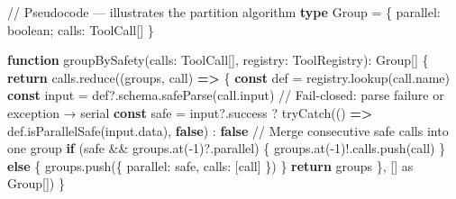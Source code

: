 \documentclass[
  english,
  11pt,
  letterpaper,
]{book}
\newenvironment{Shaded}{\begin{snugshade}}{\end{snugshade}}
\newcommand{\AttributeTok}[1]{\textcolor[rgb]{0.40,0.45,0.13}{#1}}
\newcommand{\CommentTok}[1]{\textcolor[rgb]{0.37,0.37,0.37}{#1}}
\newcommand{\ControlFlowTok}[1]{\textcolor[rgb]{0.00,0.23,0.31}{\textbf{#1}}}
\newcommand{\DataTypeTok}[1]{\textcolor[rgb]{0.68,0.00,0.00}{#1}}
\newcommand{\DecValTok}[1]{\textcolor[rgb]{0.68,0.00,0.00}{#1}}
\newcommand{\FunctionTok}[1]{\textcolor[rgb]{0.28,0.35,0.67}{#1}}
\newcommand{\ImportTok}[1]{\textcolor[rgb]{0.00,0.46,0.62}{#1}}
\newcommand{\KeywordTok}[1]{\textcolor[rgb]{0.00,0.23,0.31}{\textbf{#1}}}
\newcommand{\NormalTok}[1]{\textcolor[rgb]{0.00,0.23,0.31}{#1}}
\newcommand{\OperatorTok}[1]{\textcolor[rgb]{0.37,0.37,0.37}{#1}}
\begin{document}
\begin{Shaded}
\begin{Highlighting}[]
\CommentTok{// Pseudocode — illustrates the partition algorithm}
\KeywordTok{type}\NormalTok{ Group }\OperatorTok{=}\NormalTok{ \{ parallel}\OperatorTok{:} \DataTypeTok{boolean}\OperatorTok{;}\NormalTok{ calls}\OperatorTok{:}\NormalTok{ ToolCall[] \}}

\KeywordTok{function} \FunctionTok{groupBySafety}\NormalTok{(calls}\OperatorTok{:}\NormalTok{ ToolCall[]}\OperatorTok{,}\NormalTok{ registry}\OperatorTok{:}\NormalTok{ ToolRegistry)}\OperatorTok{:}\NormalTok{ Group[] \{}
  \ControlFlowTok{return}\NormalTok{ calls}\OperatorTok{.}\FunctionTok{reduce}\NormalTok{((groups}\OperatorTok{,}\NormalTok{ call) }\KeywordTok{=\textgreater{}}\NormalTok{ \{}
    \KeywordTok{const}\NormalTok{ def }\OperatorTok{=}\NormalTok{ registry}\OperatorTok{.}\FunctionTok{lookup}\NormalTok{(call}\OperatorTok{.}\AttributeTok{name}\NormalTok{)}
    \KeywordTok{const}\NormalTok{ input }\OperatorTok{=}\NormalTok{ def}\OperatorTok{?.}\AttributeTok{schema}\OperatorTok{.}\FunctionTok{safeParse}\NormalTok{(call}\OperatorTok{.}\AttributeTok{input}\NormalTok{)}
    \CommentTok{// Fail{-}closed: parse failure or exception → serial}
    \KeywordTok{const}\NormalTok{ safe }\OperatorTok{=}\NormalTok{ input}\OperatorTok{?.}\AttributeTok{success}
      \OperatorTok{?} \FunctionTok{tryCatch}\NormalTok{(() }\KeywordTok{=\textgreater{}}\NormalTok{ def}\OperatorTok{.}\FunctionTok{isParallelSafe}\NormalTok{(input}\OperatorTok{.}\AttributeTok{data}\NormalTok{)}\OperatorTok{,} \KeywordTok{false}\NormalTok{)}
      \OperatorTok{:} \KeywordTok{false}
    \CommentTok{// Merge consecutive safe calls into one group}
    \ControlFlowTok{if}\NormalTok{ (safe }\OperatorTok{\&\&}\NormalTok{ groups}\OperatorTok{.}\FunctionTok{at}\NormalTok{(}\OperatorTok{{-}}\DecValTok{1}\NormalTok{)}\OperatorTok{?.}\AttributeTok{parallel}\NormalTok{) \{}
\NormalTok{      groups}\OperatorTok{.}\FunctionTok{at}\NormalTok{(}\OperatorTok{{-}}\DecValTok{1}\NormalTok{)}\OperatorTok{!.}\AttributeTok{calls}\OperatorTok{.}\FunctionTok{push}\NormalTok{(call)}
\NormalTok{    \} }\ControlFlowTok{else}\NormalTok{ \{}
\NormalTok{      groups}\OperatorTok{.}\FunctionTok{push}\NormalTok{(\{ parallel}\OperatorTok{:}\NormalTok{ safe}\OperatorTok{,}\NormalTok{ calls}\OperatorTok{:}\NormalTok{ [call] \})}
\NormalTok{    \}}
    \ControlFlowTok{return}\NormalTok{ groups}
\NormalTok{  \}}\OperatorTok{,}\NormalTok{ [] }\ImportTok{as}\NormalTok{ Group[])}
\NormalTok{\}}
\end{Highlighting}
\end{Shaded}
\end{document}
